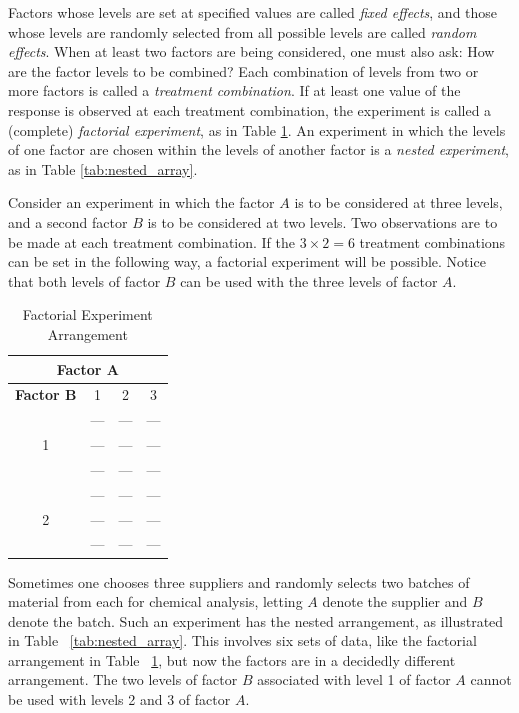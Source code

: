 \documentclass{WileySev}
\newcommand{\myexample}[2]{
    \begin{tcolorbox}[enhanced,colback=black!5!white,colframe=black,sharp corners,title={Example: #1}]#2
    \end{tcolorbox}
}
\begin{document}
Factors whose levels are set at specified values are called \textit{fixed effects}, and those whose levels are randomly selected from all possible levels are called \textit{random effects}. When at least two factors are being considered, one must also ask: How are the factor levels to be combined? Each combination of levels from two or more factors is called a \textit{treatment combination}. If at least one value of the response is observed at each treatment combination, the experiment is called a (complete) \textit{factorial experiment}, as in Table \ref{tab:factorial_array}. An experiment in which the levels of one factor are chosen within the levels of another factor is a \textit{nested experiment}, as in Table \ref{tab:nested_array}.
\\
\myexample{Factorial Experiment}{Consider an experiment in which the factor $A$ is to be considered at three levels, and a second factor $B$ is to be considered at two levels. Two observations are to be made at each treatment combination. If the $3 \times 2 = 6$ treatment combinations can be set in the following way, a factorial experiment will be possible. Notice that both levels of factor $B$ can be used with the three levels of factor $A$.}

\begin{table}[h]
\caption{Factorial Experiment Arrangement}
\centering
\begin{tabular}{ c|ccc }
\hline
\multicolumn{4}{c}{\textbf{Factor A}} \\
\hline
\textbf{Factor B} & 1 & 2 & 3 \\
\hline
\multirow{3}{6em}{1} & --- & --- & --- \\
& --- & --- & --- \\
& --- & --- & --- \\
\hline
\multirow{3}{6em}{2} & --- & --- & --- \\
& --- & --- & --- \\
& --- & --- & --- \\
\hline
\end{tabular}
\label{tab:factorial_array}
\end{table}

\myexample{Nested Experiment}{Sometimes one chooses three suppliers and randomly selects two batches of material from each for chemical analysis, letting $A$ denote the supplier and $B$ denote the batch. Such an experiment has the nested arrangement, as illustrated in Table ~\ref{tab:nested_array}. This involves six sets of data, like the factorial arrangement in Table ~\ref{tab:factorial_array}, but now the factors are in a decidedly different arrangement. The two levels of factor $B$ associated with level 1 of factor $A$ cannot be used with levels 2 and 3 of factor $A$.}
\end{document}
